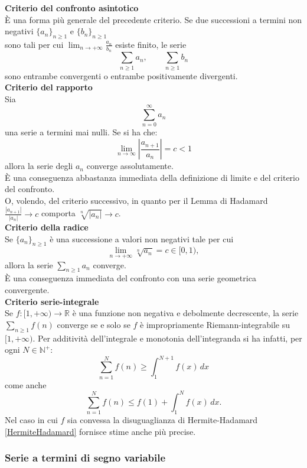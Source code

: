 \documentclass[a4paper,twoside]{article}
\newcommand{\N}{\mathbb{N}}
\theoremstyle{definition}
\numberwithin{theorem}{section}
\begin{document}
\textbf{Criterio del confronto asintotico} \\
È una forma più generale del precedente criterio. Se due successioni a termini non negativi $\{a_n\}_{n\geq 1}$ e $\{b_n\}_{n\geq 1}$ \\sono tali per cui $\lim_{n\to+\infty}\frac{a_n}{b_n}$ esiste finito, le serie 
$$ \sum_{n\geq 1} a_n,\qquad \sum_{n\geq 1} b_n $$
sono entrambe convergenti o entrambe positivamente divergenti.\\

\textbf{Criterio del rapporto} \\
Sia
$$\sum_{n=0}^{\infty}a_n$$
una serie a termini mai nulli. Se si ha che:
$$\lim_{n\to\infty} \left|\frac{a_{n+1}}{a_n}\right|=c<1$$
allora la serie degli $a_n$ converge assolutamente.\\
È una conseguenza abbastanza immediata della definizione di limite e del criterio del confronto.\\ O, volendo, del criterio successivo, in quanto per il Lemma di Hadamard $\frac{|a_{n+1}|}{|a_n|}\to c$ comporta $\sqrt[n]{|a_n|}\to c$.\\

\textbf{Criterio della radice} \\
Se $\{a_n\}_{n\geq 1}$ è una successione a valori non negativi tale per cui
$$ \lim_{n\to +\infty}\sqrt[n]{a_n} = c \in [0,1), $$
allora la serie $\sum_{n\geq 1}a_n$ converge.\\
È una conseguenza immediata del confronto con una serie geometrica convergente.\\

\textbf{Criterio serie-integrale} \\
Se $f:[1,+\infty)\to\mathbb{R}$ è una funzione non negativa e debolmente decrescente, la serie $\sum_{n\geq 1}f(n)$ converge se e solo se $f$ è impropriamente Riemann-integrabile su $[1,+\infty)$. Per additività dell'integrale e monotonia dell'integranda si ha infatti, per ogni $N\in\N^+$: 
$$ \sum_{n=1}^{N}f(n) \geq \int_{1}^{N+1}f(x)\,dx $$
come anche 
$$ \sum_{n=1}^{N}f(n) \leq f(1)+\int_{1}^{N}f(x)\,dx.$$
Nel caso in cui $f$ sia convessa la disuguaglianza di Hermite-Hadamard \ref{HermiteHadamard} fornisce stime anche più precise.

\subsubsection{Serie a termini di segno variabile}
\end{document}
